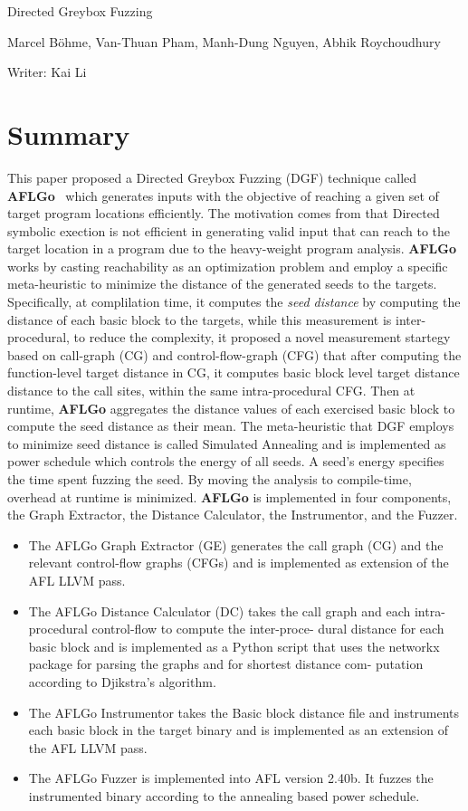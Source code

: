 \documentclass[letterpaper,11pt]{article}
\begin{document}
\begin{center}
{\Large Directed Greybox Fuzzing} 

{Marcel B\"{o}hme, Van-Thuan Pham, Manh-Dung Nguyen, Abhik Roychoudhury}
\bigskip

{\large Writer: Kai Li}
\date{\today}
\end{center}


\section{Summary}
This paper proposed a Directed Greybox Fuzzing (DGF) technique called \textbf{AFLGo}~\cite{DGF} which generates inputs with the objective of reaching a given set of target program locations efficiently. The motivation comes from that Directed symbolic exection is not efficient in generating valid input that can reach to the target location in a program due to the heavy-weight program analysis. \textbf{AFLGo} works by casting reachability as an optimization problem and employ a specific meta-heuristic to minimize the distance of the generated seeds to the targets. Specifically, at complilation time, it computes the \textit{seed distance} by computing the distance of each basic block to the targets, while this measurement is inter-procedural, to reduce the complexity, it proposed a novel measurement startegy based on call-graph (CG) and control-flow-graph (CFG) that after computing the function-level target distance in CG, it computes basic block level target distance distance to the call sites, within the same intra-procedural CFG. Then at runtime, \textbf{AFLGo} aggregates the distance values of each exercised basic block to compute the seed distance as their mean. The meta-heuristic that DGF employs to minimize seed distance is called Simulated Annealing and is implemented as power schedule which controls the energy of all seeds. A seed’s energy specifies the time spent fuzzing the seed. By moving the analysis to compile-time, overhead at runtime is minimized. \textbf{AFLGo} is implemented in four components, the Graph Extractor, the Distance Calculator, the Instrumentor, and the Fuzzer.

\begin{itemize}
	\item The AFLGo Graph Extractor (GE) generates the call graph (CG) and the relevant control-flow graphs (CFGs) and is implemented as extension of the AFL LLVM pass.
	\item The AFLGo Distance Calculator (DC) takes the call graph and each intra-procedural control-flow to compute the inter-proce- dural distance for each basic block and is implemented as a Python script that uses the networkx package for parsing the graphs and for shortest distance com- putation according to Djikstra’s algorithm.
	\item The AFLGo Instrumentor takes the Basic block distance file and instruments each basic block in the target binary and is implemented as an extension of the AFL LLVM pass.
	\item The AFLGo Fuzzer is implemented into AFL version 2.40b. It fuzzes the instrumented binary according to the annealing based power schedule. 
\end{itemize}   
\end{document}
